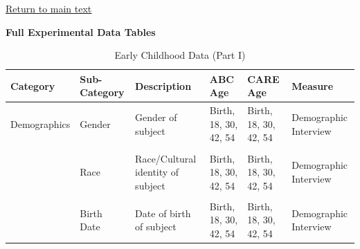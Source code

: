 \documentclass[static]{JJH-Beamer}
\begin{document}
\begin{frame}

\begin{center}
\hyperlink{ret:doughnut}{\underline{Return to main text}}
\end{center}

\end{frame}

{}
\begin{frame}

\hypertarget{potatochips}{}
\begin{center}
\textbf{Full Experimental Data Tables}
\end{center}

\end{frame}

\begin{frame}

\begin{table}[H]
\caption{Early Childhood Data (Part I)}\label{tab:ecvars_1}
\begin{center}
\begin{tabular}{L{1.4cm} C{2cm} C{1.5cm} C{1.3cm} C{1.3cm}  C{2cm}}
\toprule
\textbf{Category}	&	\textbf{Sub-Category}	&	\textbf{Description}	&	\textbf{ABC Age}  	&  \textbf{CARE Age}  & 	\textbf{Measure}	\\ \midrule
Demographics	&	Gender	&	Gender of subject	&	Birth, 18, 30, 42, 54	&	 Birth, 18, 30, 42, 54	&	Demographic Interview	\\
	&	\\
	&	Race	&	Race/Cultural identity of subject	&	Birth, 18, 30, 42, 54	&	 Birth, 18, 30, 42, 54	&	 Demographic Interview\\
	&	\\
	&	Birth Date	&	Date of birth of subject	&	Birth, 18, 30, 42, 54	& 	Birth, 18, 30, 42, 54	&	 Demographic Interview	\\
\bottomrule
\end{tabular}
\end{center}
\end{table}

\end{frame}
\end{document}

